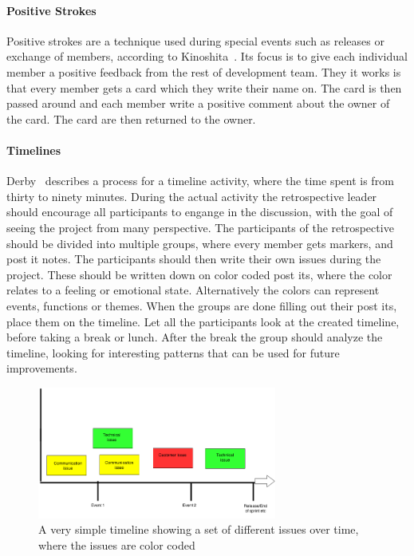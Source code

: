 \documentclass[12pt]{article}
\begin{document}
\paragraph{Positive Strokes}
Positive strokes are a technique used during special events such as releases or exchange of members, according to Kinoshita~\cite{Kinoshita2008}. Its focus is to give each individual member a positive feedback from the rest of development team. They it works is that every member gets a card which they write their name on. The card is then passed around and each member write a positive comment about the owner of the card. The card are then returned to the owner. 

\paragraph{Timelines}

Derby~\cite{Derby2007} describes a process for a timeline activity, where the time spent is from thirty to ninety minutes. During the actual activity the retrospective leader should encourage all participants to engange in the discussion, with the goal of seeing the project from many perspective. The participants of the retrospective should be divided into multiple groups, where every member gets markers, and post it notes. The participants should then write their own issues during the project. These should be written down on color coded post its, where the color relates to a feeling or emotional state. Alternatively  the colors can represent events, functions or themes. When the groups are done filling out their post its, place them on the timeline. Let all the participants look at the created timeline, before taking a break or lunch. After the break the group should analyze the timeline, looking for interesting patterns that can be used for future improvements.


\begin{figure}[h!]
	\centering
	\includegraphics[width=0.7\textwidth]{figures/Timeline-Example.png}
	\caption{A very simple timeline showing a set of different issues over time, where the issues are color coded}
	\label{figure:Timeline-Example}
\end{figure}
\end{document}
